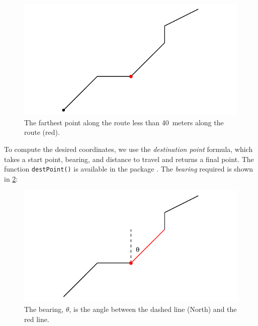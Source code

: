 \begin{knitrout}\small
{}\color{fgcolor}\begin{figure}[h]

{\centering \includegraphics[width=.6\textwidth]{figure/app:measure_step1-1} 

}

\caption[The farthest point along the route less than 40~meters along the route (red)]{The farthest point along the route less than 40~meters along the route (red).}\label{fig:app:measure_step1}
\end{figure}


\end{knitrout}

To compute the desired coordinates, we use the \emph{destination point} formula, which takes a start point, bearing, and distance to travel and returns a final point. The function \verb+destPoint()+ is available in the  package \citep{geosphere}. The \emph{bearing} required is shown in \cref{fig:app:measure_step2}:

\begin{knitrout}\small
{}\color{fgcolor}\begin{figure}[h]

{\centering \includegraphics[width=.6\textwidth]{figure/app:measure_step2-1} 

}

\caption[The bearing, $\theta$, is the angle between the dashed line (North) and the red line]{The bearing, $\theta$, is the angle between the dashed line (North) and the red line.}\label{fig:app:measure_step2}
\end{figure}


\end{knitrout}

